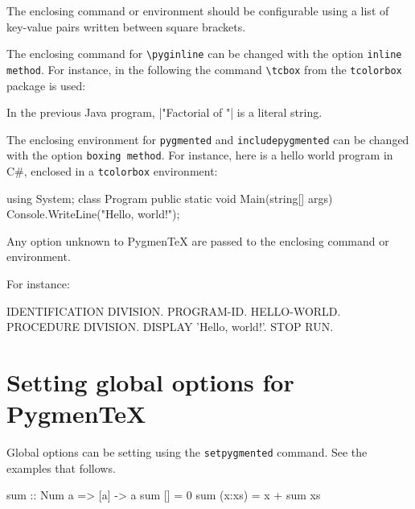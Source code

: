 \documentclass[10pt,a4paper]{article}
\begin{document}
The enclosing command or environment should be configurable using a list
of key-value pairs written between square brackets.

The enclosing command for
\verb|\pyginline| can be changed with the option
\verb|inline method|. For instance, in the following the command
\verb|\tcbox| from the \verb|tcolorbox| package is used:

\begin{Example}
  In the previous Java program,
  \pyginline[lang=java,inline method=tcbox]|"Factorial of "| is a
  literal string.
\end{Example}

The enclosing environment for \verb|pygmented| and
\verb|includepygmented| can be changed with the option
\verb|boxing method|. For instance, here is a hello world program in
C\#, enclosed in a \verb|tcolorbox| environment:

\begin{Example}
\begin{pygmented}[lang=csharp,boxing method=tcolorbox]
using System;
class Program
{
    public static void Main(string[] args)
    {
        Console.WriteLine("Hello, world!");
    }
}
\end{pygmented}
\end{Example}

Any option unknown to Pygmen\TeX{} are passed to the enclosing command
or environment.

For instance:

\begin{Example}
\begin{pygmented}[lang=cobol,boxing method=tcolorbox,colframe=red,boxrule=2mm]
       IDENTIFICATION DIVISION.
       PROGRAM-ID. HELLO-WORLD.
       PROCEDURE DIVISION.
           DISPLAY 'Hello, world!'.
           STOP RUN.
\end{pygmented}
\end{Example}

\section{Setting global options for Pygmen\TeX{}}

Global options can be setting using the \verb|setpygmented| command.
See the examples that follows.

\begin{Example}

\begin{pygmented}[]
sum :: Num a => [a] -> a
sum [] = 0
sum (x:xs) = x + sum xs
\end{pygmented}
\end{Example}
\end{document}
